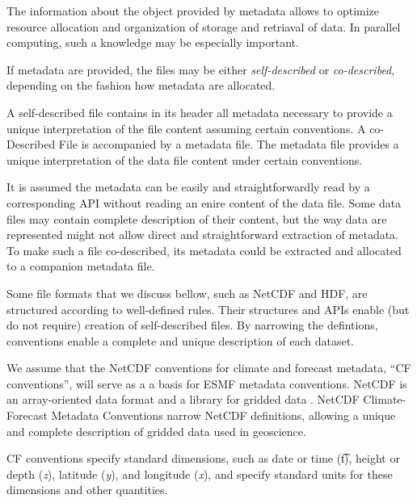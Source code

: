 The information about the object provided by metadata allows to optimize  
resource allocation and organization of storage and retriaval of data. In 
parallel computing, such a knowledge may be especially important. 

If metadata are provided, the files may be either {\em self-described} or
{\em co-described}, depending on the fashion how metadata are allocated.

A self-described file contains in its header all metadata necessary to 
provide a unique interpretation of the file content assuming certain 
conventions.  A co-Described File is accompanied by a metadata file. The
metadata file provides a unique interpretation of the data file content
under certain conventions. 

It is assumed the metadata can be easily and straightforwardly read by a 
corresponding API without reading an enire content of the data file. Some 
data files may contain complete description of their content, but the way 
data are represented might not allow direct and straightforward extraction of 
metadata. To make such a file co-described, its metadata could be extracted 
and allocated to a companion metadata file.

Some file formats that we discuss bellow, such as NetCDF and HDF, are 
structured according to well-defined rules. Their structures and APIs enable 
(but do not require) creation of self-described files. By narrowing 
the defintions, conventions enable a complete and unique description of each 
dataset.

We assume that the NetCDF conventions for climate and forecast metadata, 
``CF conventions'', will serve as a a basis for ESMF metadata conventions.
NetCDF is an array-oriented data format and a library for gridded data 
\cite{NetCDF3_UsersGuide_C}. NetCDF Climate-Forecast Metadata Conventions
\cite{NetCDF_CF_v1_beta3} narrow NetCDF definitions, allowing a unique and 
complete description of gridded data used in geoscience. 

CF conventions specify standard dimensions, such as date or time ({\t t}), 
height or depth ({\it z}), latitude ({\it y}), and longitude ({\it x}), and 
specify standard units for these dimensions and other quantities. 


